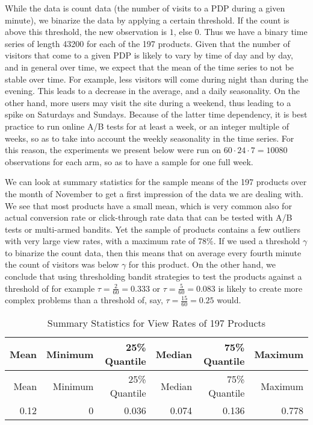 \documentclass[11pt,]{article}
\begin{document}
While the data is count data (the number of visits to a PDP during a
given minute), we binarize the data by applying a certain threshold. If
the count is above this threshold, the new observation is \(1\), else
\(0\). Thus we have a binary time series of length 43200 for each of the
197 products. Given that the number of visitors that come to a given PDP
is likely to vary by time of day and by day, and in general over time,
we expect that the mean of the time series to not be stable over time.
For example, less visitors will come during night than during the
evening. This leads to a decrease in the average, and a daily
seasonality. On the other hand, more users may visit the site during a
weekend, thus leading to a spike on Saturdays and Sundays. Because of
the latter time dependency, it is best practice to run online A/B tests
for at least a week, or an integer multiple of weeks, so as to take into
account the weekly seasonality in the time series. For this reason, the
experiments we present below were run on \(60 \cdot 24 \cdot 7 = 10080\)
observations for each arm, so as to have a sample for one full week.

We can look at summary statistics for the sample means of the 197
products over the month of November to get a first impression of the
data we are dealing with. We see that most products have a small mean,
which is very common also for actual conversion rate or click-through
rate data that can be tested with A/B tests or multi-armed bandits. Yet
the sample of products contains a few outliers with very large view
rates, with a maximum rate of 78\%. If we used a threshold \(\gamma\) to
binarize the count data, then this means that on average every fourth
minute the count of visitors was below \(\gamma\) for this product. On
the other hand, we conclude that using thresholding bandit strategies to
test the products against a threshold of for example
\(\tau = \frac{2}{60} = 0.333\) or \(\tau = \frac{5}{60} = 0.083\) is
likely to create more complex problems than a threshold of, say,
\(\tau = \frac{15}{60} = 0.25\) would.

\begin{longtable}[]{@{}rrrrrr@{}}
\caption{Summary Statistics for View Rates of 197
Products}\tabularnewline
\toprule
Mean & Minimum & 25\% Quantile & Median & 75\% Quantile &
Maximum\tabularnewline
\midrule
\endfirsthead
\toprule
Mean & Minimum & 25\% Quantile & Median & 75\% Quantile &
Maximum\tabularnewline
\midrule
\endhead
0.12 & 0 & 0.036 & 0.074 & 0.136 & 0.778\tabularnewline
\bottomrule
\end{longtable}
\end{document}
